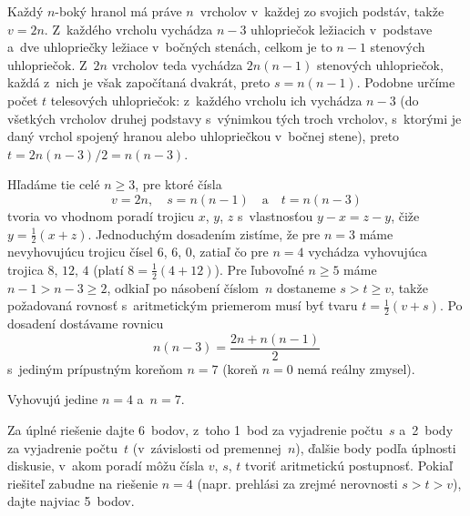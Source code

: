 {%
Každý $n$-boký hranol má práve $n$~vrcholov v~každej zo svojich
podstáv, takže $v=2n$. Z~každého vrcholu vychádza $n-3$
uhlopriečok ležiacich v~podstave a~dve uhlopriečky ležiace v~bočných
stenách, celkom je to $n-1$ stenových uhlopriečok. Z~$2n$ vrcholov
teda vychádza $2n(n-1)$ stenových uhlopriečok, každá z~nich je však
započítaná dvakrát, preto $s=n({n-1})$. Podobne určíme počet $t$
telesových uhlopriečok: z~každého vrcholu ich vychádza $n-3$ (do
všetkých vrcholov druhej podstavy s~výnimkou tých troch vrcholov,
s~ktorými je daný vrchol spojený hranou
alebo uhlopriečkou v~bočnej stene), preto
$t=2n(n-3)/2=n(n-3)$.

Hľadáme tie celé $n\ge3$, pre ktoré čísla
$$
v=2n,\quad s=n(n-1)\quad\text{a}\quad t=n(n-3)
$$
tvoria vo vhodnom poradí trojicu $x$, $y$, $z$ s~vlastnosťou $y-x=z-y$,
čiže $y=\frac12(x+z)$. Jednoduchým dosadením zistíme, že pre $n=3$
máme nevyhovujúcu trojicu čísel $6$, $6$, $0$, zatiaľ čo pre $n=4$
vychádza vyhovujúca trojica $8$, $12$, $4$ (platí $8=\frac12(4+12)$).
Pre ľubovoľné $n\ge5$ máme $n-1>n-3\ge2$, odkiaľ po násobení
číslom~$n$ dostaneme
$s>t\ge v$, takže požadovaná rovnosť s~aritmetickým priemerom
musí byť tvaru $t=\frac12(v+s)$. Po dosadení dostávame rovnicu
$$
n(n-3)=\frac{2n+n(n-1)}{2}
$$
s~jediným prípustným koreňom $n=7$ (koreň $n=0$ nemá reálny
zmysel).

\zaver
Vyhovujú jedine $n=4$ a~$n=7$.


\nobreak\medskip\petit\noindent
Za úplné riešenie dajte 6~bodov, z~toho 1~bod za
vyjadrenie počtu~$s$ a~2~body za vyjadrenie počtu~$t$ (v~závislosti
od premennej~$n$), ďalšie body podľa úplnosti diskusie, v~akom
poradí môžu čísla $v$, $s$, $t$ tvoriť aritmetickú postupnosť.
Pokiaľ riešiteľ zabudne na riešenie $n=4$ (napr. prehlási za zrejmé
nerovnosti $s>t>v$), dajte najviac 5~bodov.
\endpetit
\bigbreak}

